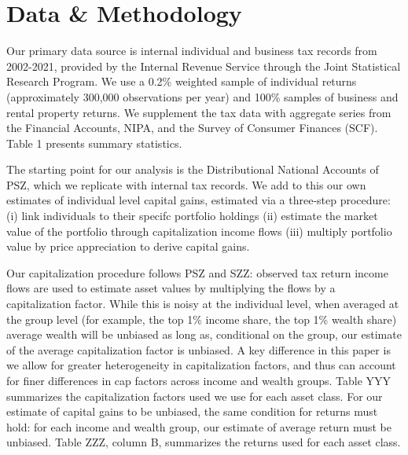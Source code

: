 \documentclass[12pt]{article}
\newcommand{\be}{\begin{equation}}
\newcommand{\ee}{\end{equation}}
\begin{document}
\section{Data \& Methodology}

Our primary data source is internal individual and business tax records from 2002-2021, provided by the Internal Revenue Service through the Joint Statistical Research Program. We use a 0.2\% weighted sample of individual returns (approximately 300,000 observations per year) and 100\% samples of business and rental property returns. We supplement the tax data with aggregate series from the Financial Accounts, NIPA, and the Survey of Consumer Finances (SCF). Table 1 presents summary statistics.

The starting point for our analysis is the Distributional National Accounts of PSZ, which we replicate with internal tax records. We add to this our own estimates of individual level capital gains, estimated via a three-step procedure: (i) link individuals to their specifc portfolio holdings (ii) estimate the market value of the portfolio through capitalization income flows (iii) multiply portfolio value by price appreciation to derive capital gains.

Our capitalization procedure follows PSZ and SZZ: observed tax return income flows are used to estimate asset values by multiplying the flows by a capitalization factor. While this is noisy at the individual level, when averaged at the group level (for example, the top 1\% income share, the top 1\% wealth share) average wealth will be unbiased as long as, conditional on the group, our estimate of the average capitalization factor is unbiased. A key difference in this paper is we allow for greater heterogeneity in capitalization factors, and thus can account for finer differences in cap factors across income and wealth groups. Table YYY summarizes the capitalization factors used we use for each asset class. For our estimate of capital gains to be unbiased, the same condition for returns must hold: for each income and wealth group, our estimate of average return must be unbiased. Table ZZZ, column B, summarizes the returns used for each asset class. 

\end{document}
